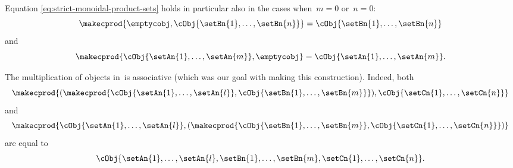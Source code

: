 Equation \cref{eq:strict-monoidal-product-sets} holds in particular also in the cases when~$m = 0$ or~$n =0$:
\begin{equation}
    \makecprod{
        \emptycobj,
        \cObj{\setBn{1}, \ldots, \setBn{n}}
    } =
    \cObj{
        \setBn{1}, \ldots, \setBn{n}
    }
\end{equation}
and
\begin{equation}
    \makecprod{
        \cObj{\setAn{1}, \ldots, \setAn{m}},
        \emptycobj
    } =
    \cObj{
        \setAn{1}, \ldots, \setAn{m}
    }.
\end{equation}


The multiplication of objects in~\SetL is associative (which was our goal with making this construction).
Indeed, both
\begin{equation}
    \makecprod{
        ( \makecprod{\cObj{\setAn{1}, \ldots, \setAn{l}}, \cObj{\setBn{1}, \ldots, \setBn{m}}})
        ,
        \cObj{\setCn{1}, \ldots, \setCn{n}}
    }
\end{equation}
and
\begin{equation}
    \makecprod{
        \cObj{\setAn{1}, \ldots, \setAn{l}},
        (
        \makecprod{
            \cObj{\setBn{1}, \ldots, \setBn{m}},
            \cObj{\setCn{1}, \ldots, \setCn{n}}
        }
        )
    }
\end{equation}
are equal to
\begin{equation}
    \cObj{\setAn{1}, \ldots, \setAn{l}, \setBn{1}, \ldots, \setBn{m}, \setCn{1}, \ldots, \setCn{n}}.
\end{equation}
